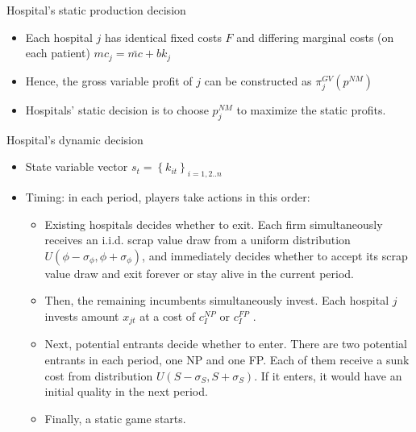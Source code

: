 \documentclass[aspectratio=169]{beamer}  %
\begin{document}
\begin{frame}{Hospital's static production decision}
    \begin{itemize}
        \item  Each hospital $j$ has identical fixed costs $F$ and differing marginal costs (on each patient) $mc_j=\bar{mc}+bk_j $
        \item Hence, the gross variable profit of $j$ can be constructed as $\pi_j^{GV}(p^{NM})$
        \item Hospitals' static decision is to choose $p_j^{NM}$ to maximize the static profits. 
    
        
    \end{itemize}

\end{frame}

\begin{frame}{Hospital's dynamic decision}
    \begin{itemize}
        \item  State variable vector $s_t=\left\{k_{it}\right\}_{i=1,2..n}$
        \item Timing: in each period, players take actions in this order: 
            \begin{itemize}
                \item Existing hospitals decides whether to exit. Each firm simultaneously receives an i.i.d. scrap value draw from a uniform distribution $U(\phi-\sigma_{\phi},\phi+\sigma_{\phi})$, and immediately decides whether to accept its scrap value draw and exit forever or stay alive in the current period.
                \item Then, the remaining incumbents simultaneously invest. Each hospital $j$ invests amount $x_{jt}$ at a cost of $c_I^{NP}$ or $c_I^{FP}$ .
                \item Next, potential entrants decide whether to enter. There are two potential entrants in each period, one NP and one FP. Each of them receive a sunk cost from distribution $U(S-\sigma_{S},S+\sigma_{S})$. If it enters, it would have an initial quality in the next period.
                \item Finally, a static game starts.
            \end{itemize}
        
    \end{itemize}

\end{frame}
\end{document}
